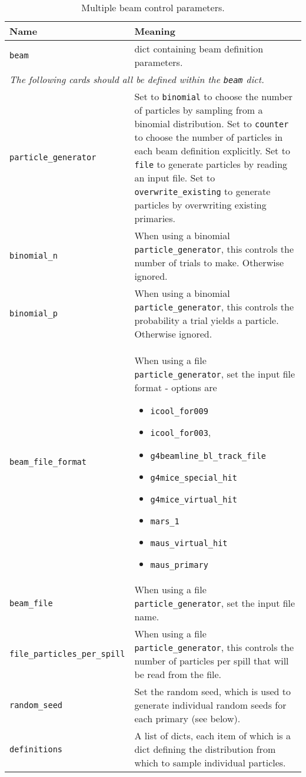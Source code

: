 \begin{table*}
\begin{center}
\caption{Multiple beam control parameters.}
\begin{tabularx}{\textwidth}{lX}
Name & Meaning \\
\hline
\verb|beam| & dict containing beam definition parameters.\\
\hline
\multicolumn{2}{l}{\emph{The following cards should all be defined within the \verb|beam| dict.}} \\
\hline
\verb|particle_generator| & Set to \verb|binomial| to choose the number of particles by sampling from a binomial distribution. Set to \verb|counter| to choose the number of particles in each beam definition explicitly. Set to \verb|file| to generate particles by reading an input file. Set to \verb|overwrite_existing| to generate particles by overwriting existing primaries. \\
\verb|binomial_n| & When using a binomial \verb|particle_generator|, this controls the number of trials to make. Otherwise ignored. \\
\verb|binomial_p| & When using a binomial \verb|particle_generator|, this controls the probability a trial yields a particle. Otherwise ignored. \\
\verb|beam_file_format| & When using a file \verb|particle_generator|, set the input file format - options are 
                          \begin{itemize}
                            \setlength{\itemsep}{0mm}
                            \item \verb|icool_for009|
                            \item \verb|icool_for003|,
                            \item \verb|g4beamline_bl_track_file|
                            \item \verb|g4mice_special_hit|
                            \item \verb|g4mice_virtual_hit|
                            \item  \verb|mars_1|
                            \item \verb|maus_virtual_hit|
                            \item \verb|maus_primary|
                          \end{itemize}\\
\verb|beam_file|&  When using a file \verb|particle_generator|, set the input file name.\\
\verb|file_particles_per_spill| & When using a file \verb|particle_generator|, this controls the number of particles per spill that will be read from the file.\\
\verb|random_seed| & Set the random seed, which is used to generate individual random seeds for each primary (see below). \\
\verb|definitions| & A list of dicts, each item of which is a dict defining the distribution from which to sample individual particles. \\
\end{tabularx}
\end{center}
\end{table*}



